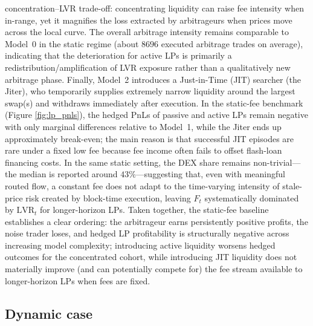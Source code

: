 \documentclass[11pt]{article}
\begin{document}
concentration--LVR trade-off: concentrating liquidity can raise fee intensity when in-range, yet it magnifies the loss extracted by 
arbitrageurs when prices move across the local curve. The overall arbitrage intensity remains
comparable to Model~0 in the static regime (about $8696$ executed arbitrage trades on average), indicating that the deterioration
for active LPs is primarily a redistribution/amplification of LVR exposure rather than a qualitatively new arbitrage phase. 
Finally, Model~2 introduces a Just-in-Time (JIT) searcher (the Jiter), who temporarily 
supplies extremely narrow liquidity around the largest swap(s) and withdraws immediately after execution.  In the static-fee 
benchmark (Figure \ref{fig:lp_pnls}), the hedged PnLs of passive and active LPs remain negative with only marginal differences relative to Model~1,
while the Jiter ends up approximately break-even; the main reason is that successful JIT episodes are rare under a fixed low fee 
because fee income often fails to offset flash-loan financing costs.  In the same static setting, the DEX share remains non-trivial---
the median is reported around $43\%$---suggesting that, even with meaningful routed flow, a constant fee does not adapt to the 
time-varying intensity of stale-price risk created by block-time execution, leaving $F_t$ systematically dominated by 
$\mathrm{LVR}_t$ for longer-horizon LPs.  Taken together, the static-fee baseline establishes a clear ordering: the arbitrageur
earns persistently positive profits, the noise trader loses, and hedged LP profitability is structurally negative across increasing
model complexity; introducing active liquidity worsens hedged outcomes for the concentrated cohort, while introducing JIT liquidity does not
materially improve (and can potentially compete for) the fee stream available to longer-horizon LPs when fees are fixed. 



\FloatBarrier
\subsection{Dynamic case}
\label{sec:dynamic_fees}
\end{document}
